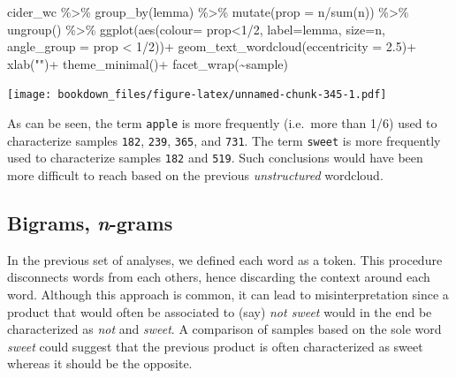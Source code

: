 \documentclass[
]{krantz}
\makeatletter
\newenvironment{Shaded}{\begin{snugshade}}{\end{snugshade}}
\newcommand{\AttributeTok}[1]{\textcolor[rgb]{0.61,0.61,0.61}{#1}}
\newcommand{\DecValTok}[1]{\textcolor[rgb]{0.06,0.06,0.06}{#1}}
\newcommand{\FloatTok}[1]{\textcolor[rgb]{0.06,0.06,0.06}{#1}}
\newcommand{\FunctionTok}[1]{\textcolor[rgb]{0,0,0}{#1}}
\newcommand{\NormalTok}[1]{#1}
\newcommand{\SpecialCharTok}[1]{\textcolor[rgb]{0,0,0}{#1}}
\newcommand{\StringTok}[1]{\textcolor[rgb]{0.5,0.5,0.5}{#1}}
\newenvironment{kframe}{%
\medskip{}
\setlength{\fboxsep}{.8em}
 \def\at@end@of@kframe{}%
 \ifinner\ifhmode%
  \def\at@end@of@kframe{\end{minipage}}%
  \begin{minipage}{\columnwidth}%
 \fi\fi%
 \def\FrameCommand##1{\hskip\@totalleftmargin \hskip-\fboxsep
 \colorbox{shadecolor}{##1}\hskip-\fboxsep
     \hskip-\linewidth \hskip-\@totalleftmargin \hskip\columnwidth}%
 \MakeFramed {\advance\hsize-\width
   \@totalleftmargin\z@ \linewidth\hsize
   \@setminipage}}%
 {\par\unskip\endMakeFramed%
 \at@end@of@kframe}
\renewenvironment{Shaded}{\begin{kframe}}{\end{kframe}}
\makeatother
\begin{document}
\begin{Shaded}
\begin{Highlighting}[]
\NormalTok{cider\_wc }\SpecialCharTok{\%\textgreater{}\%} 
  \FunctionTok{group\_by}\NormalTok{(lemma) }\SpecialCharTok{\%\textgreater{}\%} 
  \FunctionTok{mutate}\NormalTok{(}\AttributeTok{prop =}\NormalTok{ n}\SpecialCharTok{/}\FunctionTok{sum}\NormalTok{(n)) }\SpecialCharTok{\%\textgreater{}\%} 
  \FunctionTok{ungroup}\NormalTok{() }\SpecialCharTok{\%\textgreater{}\%} 
  \FunctionTok{ggplot}\NormalTok{(}\FunctionTok{aes}\NormalTok{(}\AttributeTok{colour=}\NormalTok{ prop}\SpecialCharTok{\textless{}}\DecValTok{1}\SpecialCharTok{/}\DecValTok{2}\NormalTok{, }\AttributeTok{label=}\NormalTok{lemma, }\AttributeTok{size=}\NormalTok{n, }
             \AttributeTok{angle\_group =}\NormalTok{ prop }\SpecialCharTok{\textless{}} \DecValTok{1}\SpecialCharTok{/}\DecValTok{2}\NormalTok{))}\SpecialCharTok{+}
  \FunctionTok{geom\_text\_wordcloud}\NormalTok{(}\AttributeTok{eccentricity =} \FloatTok{2.5}\NormalTok{)}\SpecialCharTok{+}
  \FunctionTok{xlab}\NormalTok{(}\StringTok{""}\NormalTok{)}\SpecialCharTok{+}
  \FunctionTok{theme\_minimal}\NormalTok{()}\SpecialCharTok{+}
  \FunctionTok{facet\_wrap}\NormalTok{(}\SpecialCharTok{\textasciitilde{}}\NormalTok{sample)}
\end{Highlighting}
\end{Shaded}

\texttt{[image: bookdown\_files/figure-latex/unnamed-chunk-345-1.pdf]}

As can be seen, the term \texttt{apple} is more frequently (i.e.~more than 1/6) used to characterize samples \texttt{182}, \texttt{239}, \texttt{365}, and \texttt{731}. The term \texttt{sweet} is more frequently used to characterize samples \texttt{182} and \texttt{519}. Such conclusions would have been more difficult to reach based on the previous \emph{unstructured} wordcloud.

\hypertarget{bigrams-n-grams}{%
\subsection{\texorpdfstring{Bigrams, \emph{n}-grams}{Bigrams, n-grams}}\label{bigrams-n-grams}}

In the previous set of analyses, we defined each word as a token. This procedure disconnects words from each others, hence discarding the context around each word. Although this approach is common, it can lead to misinterpretation since a product that would often be associated to (say) \emph{not sweet} would in the end be characterized as \emph{not} and \emph{sweet}. A comparison of samples based on the sole word \emph{sweet} could suggest that the previous product is often characterized as sweet whereas it should be the opposite.
\end{document}
